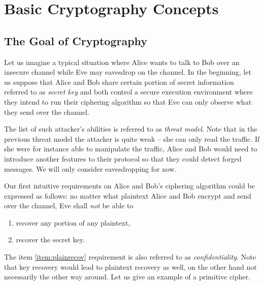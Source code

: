 \section{Basic Cryptography Concepts}
\label{sec:cryptobasics}

\subsection{The Goal of Cryptography}



Let us imagine a typical situation where Alice wants to talk to Bob over an insecure channel while Eve may eavesdrop on the channel. In the beginning, let us suppose that Alice and Bob share certain portion of secret information referred to as {\em secret key} and both control a secure execution environment where they intend to run their ciphering algorithm so that Eve can only observe what they send over the channel.

\begin{note}
	The list of such attacker's abilities is referred to as {\em threat model}. Note that in the previous threat model the attacker is quite weak -- she can only read the traffic. If she were for instance able to manipulate the traffic, Alice and Bob would need to introduce another features to their protocol so that they could detect forged messages. We will only consider eavesdropping for now.
\end{note}

Our first intuitive requirements on Alice and Bob's ciphering algorithm could be expressed as follows: no matter what plaintext Alice and Bob encrypt and send over the channel, Eve shall {\em not} be able to
\begin{enumerate}
	\item recover any portion of any plaintext, \label{item:plainrecov}
	\item recover the secret key. \label{item:keyrecov}
\end{enumerate}
The item \ref{item:plainrecov} requirement is also referred to as {\em confidentiality}. Note that key recovery would lead to plaintext recovery as well, on the other hand not necessarily the other way around. Let us give an example of a primitive cipher.

